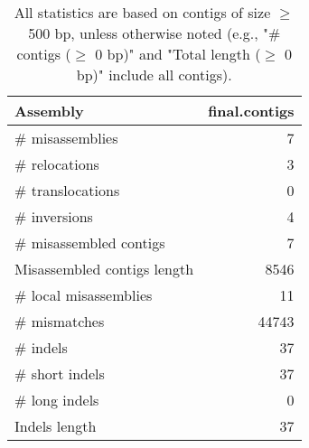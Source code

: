 \documentclass[12pt,a4paper]{article}
\begin{document}
\begin{table}[ht]
\begin{center}
\caption{All statistics are based on contigs of size $\geq$ 500 bp, unless otherwise noted (e.g., "\# contigs ($\geq$ 0 bp)" and "Total length ($\geq$ 0 bp)" include all contigs).}
\begin{tabular}{|l*{1}{|r}|}
\hline
Assembly & final.contigs \\ \hline
\# misassemblies & 7 \\ \hline
\hspace{5mm}\# relocations & 3 \\ \hline
\hspace{5mm}\# translocations & 0 \\ \hline
\hspace{5mm}\# inversions & 4 \\ \hline
\# misassembled contigs & 7 \\ \hline
Misassembled contigs length & 8546 \\ \hline
\# local misassemblies & 11 \\ \hline
\# mismatches & 44743 \\ \hline
\# indels & 37 \\ \hline
\hspace{5mm}\# short indels & 37 \\ \hline
\hspace{5mm}\# long indels & 0 \\ \hline
Indels length & 37 \\ \hline
\end{tabular}
\end{center}
\end{table}
\end{document}
